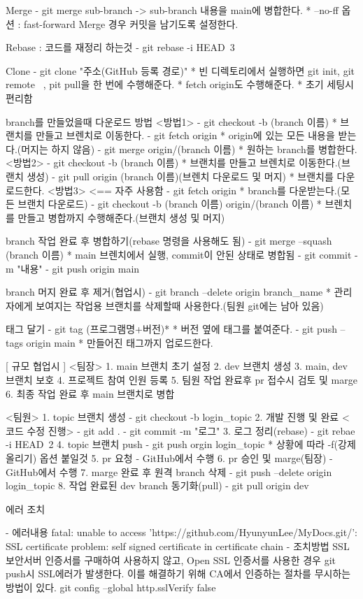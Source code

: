 Merge
  - git merge sub-branch
    -> sub-branch 내용을 main에 병합한다.
    * --no-ff 옵션 : fast-forward Merge 경우 커밋을 남기도록 설정한다.

Rebase : 코드를 재정리 하는것
  - git rebase -i HEAD~3

Clone
  - git clone "주소(GitHub 등록 경로)"
    * 빈 디렉토리에서 실행하면 git init, git remote ~, pit pull을 한 번에 수행해준다.
    * fetch origin도 수행해준다.
    * 초기 세팅시 편리함

branch를 만들었을때 다운로드 방법
  <방법1>
  - git checkout -b (branch 이름)
    * 브랜치를 만들고 브렌치로 이동한다.
  - git fetch origin
    * origin에 있는 모든 내용을 받는다.(머지는 하지 않음)
  - git merge origin/(branch 이름)
    * 원하는 branch를 병합한다.
  <방법2>
  - git checkout -b (branch 이름)
    * 브랜치를 만들고 브렌치로 이동한다.(브랜치 생성)
  - git pull origin (branch 이름)(브렌치 다운로드 및 머지)
    * 브랜치를 다운로드한다.
  <방법3> <== 자주 사용함
  - git fetch origin
    * branch를 다운받는다.(모든 브랜치 다운로드)
  - git checkout -b (branch 이름) origin/(branch 이름)
    * 브렌치를 만들고 병합까지 수행해준다.(브랜치 생성 및 머지)

branch 작업 완료 후 병합하기(rebase 명령을 사용해도 됨)
  - git merge --squash (branch 이름)
    * main 브렌치에서 실행, commit이 안된 상태로 병합됨
  - git commit -m "내용"
  - git push origin main

branch 머지 완료 후 제거(협업시)
  - git branch --delete origin branch_name
    * 관리자에게 보여지는 작업용 브랜치를 삭제할때 사용한다.(팀원 git에는 남아 있음)

태그 달기
  - git tag (프로그램명+버전)*
    * 버전 옆에 태그를 붙여준다.
  - git push --tags origin main 
    * 만들어진 태그까지 업로드한다.


[ 규모 협업시 ]
<팀장>
1. main 브랜치 초기 설정
2. dev 브랜치 생성
3. main, dev 브랜치 보호
4. 프로젝트 참여 인원 등록
5. 팀원 작업 완료후 pr 접수시 검토 및 marge
6. 최종 작업 완료 후 main 브랜치로 병합

<팀원>
1. topic 브랜치 생성
    - git checkout -b login_topic
2. 개발 진행 및 완료
    <코드 수정 진행>
    - git add .
    - git commit -m "로그"
3. 로그 정리(rebase)
    - git rebae -i HEAD~2
4. topic 브랜치 push
    - git push orgin login_topic
      * 상황에 따라 -f(강제올리기) 옵션 붙일것
5. pr 요청
    - GitHub에서 수행
6. pr 승인 및 marge(팀장)
    - GitHub에서 수행
7. marge 완료 후 원격 branch 삭제
    - git push --delete origin login_topic
8. 작업 완료된 dev branch 동기화(pull)
    - git pull origin dev

에러 조치

- 에러내용 
   fatal: unable to access 'https://github.com/HyunyunLee/MyDocs.git/': SSL certificate problem: self signed certificate in certificate chain
- 조치방법
   SSL 보안서버 인증서를 구매하여 사용하지 않고, Open SSL 인증서를 사용한 경우 git push시 SSL에러가 발생한다.
   이를 해결하기 위해 CA에서 인증하는 절차를 무시하는 방법이 있다.
   git config --global http.sslVerify false
